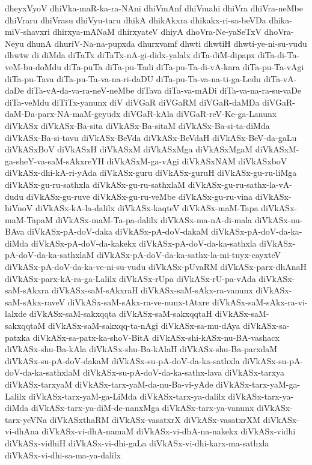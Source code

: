 {dheyxVyoV
dhiVka-maR-ka-ra-NAni
dhiVmAnf
dhiVmahi
dhiVra
dhiVra-neMbe
dhiVraru
dhiVrasu
dhiVyu-taru
dhikA
dhikAkxra
dhikakx-ri-sa-beVDa
dhika-miV-shavxri
dhirxya-mANaM
dhirxyateV
dhiyA
dhoVra-Ne-yaSeTxV
dhoVra-Neyu
dhunA
dhuriV-Na-na-pupxda
dhurxvamf
dhwti
dhwtiH
dhwti-ye-ni-su-vudu
dhwtw
di
diMda
diTaTx
diTaTx-nA-gi-didx-yalalx
diTa-diM-dipapx
diTa-di-Ta-veM-bu-doMdu
diTa-puTa
diTa-pu-Tadi
diTa-pu-Ta-di-vA-kara
diTa-pu-Ta-vAgi
diTa-pu-Tava
diTa-pu-Ta-va-na-ri-daDU
diTa-pu-Ta-va-na-ti-ga-Ledu
diTa-vA-daDe
diTa-vA-da-va-ra-neV-neMbe
diTava
diTa-va-mADi
diTa-va-na-ra-su-vaDe
diTa-veMdu
diTiTx-yanunx
diV
diVGaR
diVGaRM
diVGaR-daMDa
diVGaR-daM-Da-parx-NA-maM-geyudx
diVGaR-kAla
diVGaR-reV-Ke-ga-Lanunx
diVkASx
diVkASx-Ba-sita
diVkASx-Ba-sitaM
diVkASx-Ba-si-ta-diMda
diVkASx-Ba-si-tavu
diVkASx-BeVda
diVkASx-BeVdaH
diVkASx-BeV-da-gaLu
diVkASxBoV
diVkASxH
diVkASxM
diVkASxMga
diVkASxMgaM
diVkASxM-ga-sheY-va-saM-sAkxreYH
diVkASxM-ga-vAgi
diVkASxNAM
diVkASxboV
diVkASx-dhi-kA-ri-yAda
diVkASx-guru
diVkASx-guruH
diVkASx-gu-ru-liMga
diVkASx-gu-ru-sathxla
diVkASx-gu-ru-sathxlaM
diVkASx-gu-ru-sathx-la-vA-dudu
diVkASx-gu-ruve
diVkASx-gu-ru-veMbe
diVkASx-gu-ru-vina
diVkASx-hiVnoV
diVkASx-kA-la-dalilx
diVkASx-kaqteV
diVkASx-maM-Tapa
diVkASx-maM-TapaM
diVkASx-maM-Ta-pa-dalilx
diVkASx-ma-nA-di-mala
diVkASx-nu-BAva
diVkASx-pA-doV-daka
diVkASx-pA-doV-dakaM
diVkASx-pA-doV-da-ka-diMda
diVkASx-pA-doV-da-kakekx
diVkASx-pA-doV-da-ka-sathxla
diVkASx-pA-doV-da-ka-sathxlaM
diVkASx-pA-doV-da-ka-sathx-la-mi-tuyx-cayxteV
diVkASx-pA-doV-da-ka-ve-ni-su-vudu
diVkASx-pUvaRM
diVkASx-parx-dhAnaH
diVkASx-parx-kA-ra-ga-Lalilx
diVkASx-rUpa
diVkASx-rU-pa-vAda
diVkASx-saM-sAkxra
diVkASx-saM-sAkxraH
diVkASx-saM-sAkx-ra-vanunx
diVkASx-saM-sAkx-raveV
diVkASx-saM-sAkx-ra-ve-nunx-tAtxre
diVkASx-saM-sAkx-ra-vi-lalxde
diVkASx-saM-sakxqqta
diVkASx-saM-sakxqqtaH
diVkASx-saM-sakxqqtaM
diVkASx-saM-sakxqq-ta-nAgi
diVkASx-sa-mu-dAya
diVkASx-sa-patxka
diVkASx-sa-patx-ka-shoV-BitA
diVkASx-shi-kASx-nu-BA-vashacx
diVkASx-shu-Ba-kAla
diVkASx-shu-Ba-kAlaH
diVkASx-shu-Ba-parxdaM
diVkASx-su-pA-doV-dakaM
diVkASx-su-pA-doV-da-ka-sathxla
diVkASx-su-pA-doV-da-ka-sathxlaM
diVkASx-su-pA-doV-da-ka-sathx-lava
diVkASx-tarxya
diVkASx-tarxyaM
diVkASx-tarx-yaM-da-nu-Ba-vi-yAde
diVkASx-tarx-yaM-ga-Lalilx
diVkASx-tarx-yaM-ga-LiMda
diVkASx-tarx-ya-dalilx
diVkASx-tarx-ya-diMda
diVkASx-tarx-ya-diM-de-nanxMga
diVkASx-tarx-ya-vanunx
diVkASx-tarx-yeVNa
diVkASxthaRM
diVkASx-vasatxrX
diVkASx-vasatxrXM
diVkASx-vi-dhAna
diVkASx-vi-dhA-namaM
diVkASx-vi-dhA-na-nakekx
diVkASx-vidhi
diVkASx-vidhiH
diVkASx-vi-dhi-gaLa
diVkASx-vi-dhi-karx-ma-sathxla
diVkASx-vi-dhi-sa-ma-ya-dalilx
}
